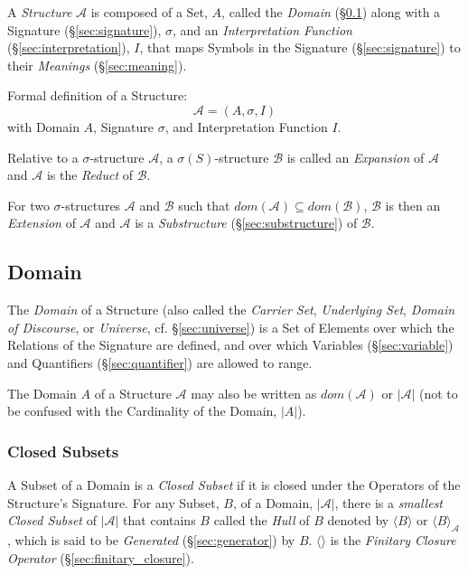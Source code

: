 A \emph{Structure} $\mathcal{A}$ is composed of a Set, $A$, called the
\emph{Domain} (\S\ref{sec:domain}) along with a Signature
(\S\ref{sec:signature}), $\sigma$, and an \emph{Interpretation
  Function} (\S\ref{sec:interpretation}), $I$, that maps Symbols in
the Signature (\S\ref{sec:signature}) to their \emph{Meanings}
(\S\ref{sec:meaning}).

Formal definition of a Structure:
\[
  \mathcal{A} = (A, \sigma, I)
\]
with Domain $A$, Signature $\sigma$, and Interpretation Function $I$.

Relative to a $\sigma$-structure $\mathcal{A}$, a
$\sigma(S)$-structure $\mathcal{B}$ is called an \emph{Expansion} of
$\mathcal{A}$ and $\mathcal{A}$ is the \emph{Reduct} of $\mathcal{B}$.

For two $\sigma$-structures $\mathcal{A}$ and $\mathcal{B}$ such that
$dom(\mathcal{A}) \subseteq dom(\mathcal{B})$, $\mathcal{B}$ is then
an \emph{Extension} of $\mathcal{A}$ and $\mathcal{A}$ is a
\emph{Substructure} (\S\ref{sec:substructure}) of $\mathcal{B}$.



\subsection{Domain}\label{sec:domain}

The \emph{Domain} of a Structure (also called the \emph{Carrier Set},
\emph{Underlying Set}, \emph{Domain of Discourse}, or \emph{Universe},
cf. \S\ref{sec:universe}) is a Set of Elements over which the
Relations of the Signature are defined, and over which Variables
(\S\ref{sec:variable}) and Quantifiers (\S\ref{sec:quantifier}) are
allowed to range.

The Domain $A$ of a Structure $\mathcal{A}$ may also be written as
$dom(\mathcal{A})$ or $|\mathcal{A}|$ (not to be confused with the
Cardinality of the Domain, $|A|$).



\subsubsection{Closed Subsets}\label{sec:closed_subset}

A Subset of a Domain is a \emph{Closed Subset} if it is closed under
the Operators of the Structure's Signature. For any Subset, $B$, of a
Domain, $|\mathcal{A}|$, there is a \emph{smallest Closed Subset} of
$|\mathcal{A}|$ that contains $B$ called the \emph{Hull} of $B$
denoted by $\langle B \rangle$ or $\langle B \rangle_{\mathcal{A}}$,
which is said to be \emph{Generated} (\S\ref{sec:generator}) by $B$.
$\langle \rangle$ is the \emph{Finitary Closure Operator}
(\S\ref{sec:finitary_closure}).



